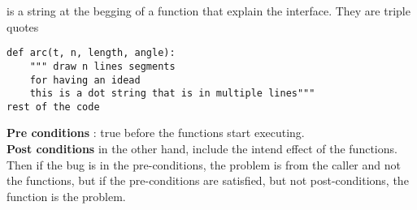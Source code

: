 \documentclass{report}
\begin{document}
 is a string at the begging of a function that explain the interface. They are triple quotes
\begin{verbatim}
def arc(t, n, length, angle):
    """ draw n lines segments
    for having an idead
    this is a dot string that is in multiple lines"""
rest of the code

\end{verbatim}
\textbf{Pre conditions} : true before the functions start executing.\\
\textbf{Post conditions} in the other hand, include the intend effect of the functions.\\
Then if the bug is in the pre-conditions, the problem is from the caller and not the functions, but
if the pre-conditions are satisfied, but not post-conditions, the function is the problem.





\end{document}

